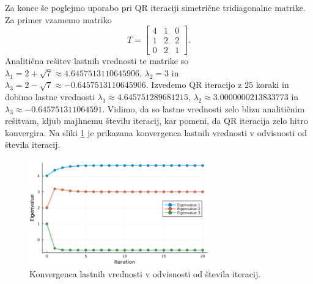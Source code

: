 \documentclass[11pt, titlepage]{article}
\begin{document}
Za konec še poglejmo uporabo pri QR iteraciji simetrične tridiagonalne matrike. Za primer vzamemo matriko
$$
T = \begin{bmatrix}
    4 & 1 & 0 \\
    1 & 2 & 2 \\
    0 & 2 & 1
\end{bmatrix}.
$$
Analitična rešitev lastnih vrednosti te matrike so $\lambda_1 = 2 + \sqrt{7} \approx 4.6457513110645906$, $\lambda_2 = 3$ in $\lambda_3 = 2 - \sqrt{7} \approx -0.6457513110645906$.
Izvedemo QR iteracijo z $25$ koraki in dobimo lastne vrednosti $\lambda_1 \approx 4.645751289681215$, $\lambda_2 \approx 3.0000000213833773$ in $\lambda_3 \approx -0.645751311064591$.
Vidimo, da so lastne vrednosti zelo blizu analitičnim rešitvam, kljub majhnemu številu iteracij, kar pomeni, da QR iteracija zelo hitro konvergira. Na sliki \ref{fig:qr_iteration} je prikazana konvergenca lastnih vrednosti v odvisnosti od števila iteracij.
\begin{figure}[ht]
    \centering
    \includegraphics[width=0.7\textwidth]{figures/qr_iteration_convergence.png}
    \caption{Konvergenca lastnih vrednosti v odvisnosti od števila iteracij.}
    \label{fig:qr_iteration}
\end{figure}
\end{document}
